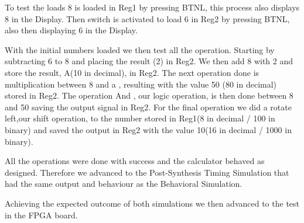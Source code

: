 \documentclass[12pt]{article}
\begin{document}
To test the loads 8 is loaded in Reg1 by pressing BTNL, this process also displays 8 in the Display. Then switch is activated to load 6 in Reg2 by pressing BTNL, also then displaying 6 in the Display.

With the initial numbers loaded we then test all the operation. Starting by subtracting 6 to 8 and placing the result (2) in Reg2. We then add 8 with 2 and store the result, A(10 in decimal), in Reg2. The next operation done is multiplication between 8 and a , resulting with the value 50 (80 in decimal) stored in Reg2. The operation And , our logic operation, is then done between 8 and 50 saving the output signal in Reg2. For the final operation we did a rotate left,our shift operation, to the number stored in Reg1(8 in decimal / 100 in binary) and saved the output in Reg2 with the value 10(16 in decimal / 1000 in binary). 

All the operations were done with success and the calculator behaved as designed. Therefore we advanced to the Post-Synthesis Timing Simulation that had the same output and behaviour as the Behavioral Simulation. 

Achieving the expected outcome of both simulations we then advanced to the test in the FPGA board.
\end{document}
